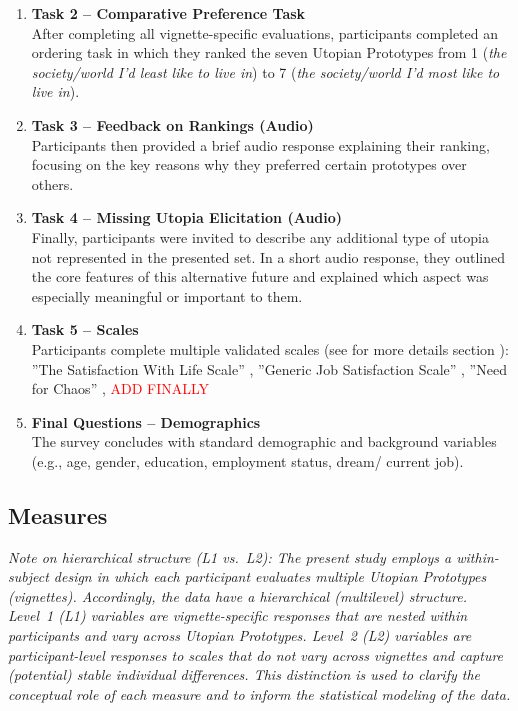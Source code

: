 \documentclass[jou,floatsintext]{apa7}
\begin{document}
\begin{enumerate}
    \item \textbf{Task 2 – Comparative Preference Task}\\
    After completing all vignette-specific evaluations, participants completed an ordering task in which they ranked the seven Utopian Prototypes from 1 (\textit{the society/world I'd least like to live in}) to 7 (\textit{the society/world I'd most like to live in}).
    
    \item \textbf{Task 3 – Feedback on Rankings (Audio)}\\
    Participants then provided a brief audio response explaining their ranking, focusing on the key reasons why they preferred certain prototypes over others.
    
    \item \textbf{Task 4 – Missing Utopia Elicitation (Audio)}\\
    Finally, participants were invited to describe any additional type of utopia not represented in the presented set. In a short audio response, they outlined the core features of this alternative future and explained which aspect was especially meaningful or important to them.

    \item \textbf{Task 5 – Scales}\\
    Participants complete multiple validated scales (see for more details section ): ''The Satisfaction With Life Scale'' \parencite{dienerSatisfactionLifeScale1985}, ''Generic Job Satisfaction Scale'' \parencite{macdonaldGenericJobSatisfaction1997}, ''Need for Chaos'' \parencite{arceneauxPeopleJustWant2021}, \textcolor{red}{ADD FINALLY}


    \item \textbf{Final Questions – Demographics}\\
    The survey concludes with standard demographic and background variables (e.g., age, gender, education, employment status, dream/ current job).
\end{enumerate}


\subsection{Measures} 
\label{sec:measures}


\textit{Note on hierarchical structure (L1 vs.\ L2): The present study employs a within-subject design in which each participant evaluates multiple Utopian Prototypes (vignettes). Accordingly, the data have a hierarchical (multilevel) structure. Level~1 (L1) variables are vignette-specific responses that are nested within participants and vary across Utopian Prototypes. Level~2 (L2) variables are participant-level responses to scales that do not vary across vignettes and capture (potential) stable individual differences. This distinction is used to clarify the conceptual role of each measure and to inform the statistical modeling of the data.}  
\end{document}
